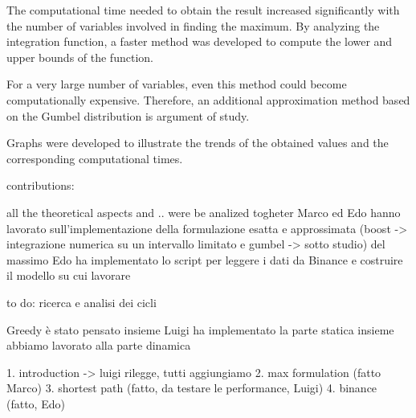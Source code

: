 The computational time needed to obtain the result increased significantly with the number of variables involved in finding the maximum. By analyzing the integration function, a faster method was developed to compute the lower and upper bounds of the function.

For a very large number of variables, even this method could become computationally expensive. Therefore, an additional approximation method based on the Gumbel distribution is argument of study.

Graphs were developed to illustrate the trends of the obtained values and the corresponding computational times.


contributions:

all the theoretical aspects and .. were be analized togheter 
Marco ed Edo hanno lavorato sull'implementazione della formulazione esatta e approssimata (boost -> integrazione numerica su un intervallo limitato e gumbel -> sotto studio) del massimo
Edo ha implementato lo script per leggere i dati da Binance e costruire il modello su cui lavorare

to do: ricerca e analisi dei cicli

Greedy è stato pensato insieme
Luigi ha implementato la parte statica
insieme abbiamo lavorato alla parte dinamica

1. introduction -> luigi rilegge, tutti aggiungiamo
2. max formulation (fatto Marco)
3. shortest path (fatto, da testare le performance, Luigi)
4. binance (fatto, Edo)